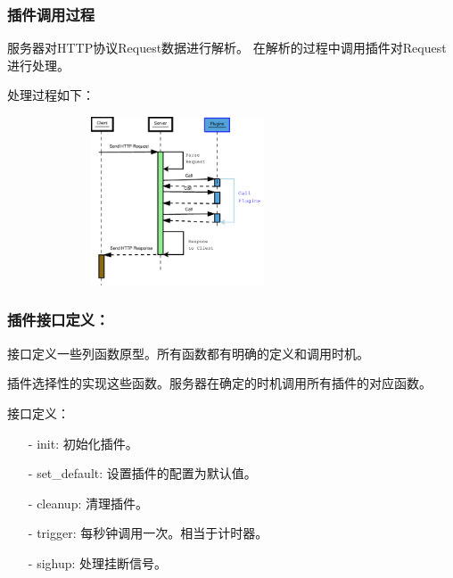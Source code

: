 \documentclass[10pt,dvipdfm]{beamer}
\begin{document}
\begin{frame}
	\frametitle{插件调用过程}
	服务器对HTTP协议Request数据进行解析。	在解析的过程中调用插件对Request进行处理。
	
	\pause
	
	\begin{block}{处理过程如下：}
	\begin{figure}[htbp]
	\centering
	\includegraphics[height=5cm, width=8cm]{pics/httpplugin.eps}
	\end{figure}
	\end{block}
\end{frame}


\begin{frame}
	\frametitle{插件接口定义：}
	接口定义一些列函数原型。所有函数都有明确的定义和调用时机。
	
	插件选择性的实现这些函数。服务器在确定的时机调用所有插件的对应函数。
	
	\pause
	
	\begin{block}{接口定义：}
	\begin{itemize}
		\item[-] init: 初始化插件。
		\item[-] set\_default: 设置插件的配置为默认值。
		\item[-] cleanup: 清理插件。
		\item[-] trigger: 每秒钟调用一次。相当于计时器。
		\item[-] sighup: 处理挂断信号。
	\end{itemize}
	\end{block}
\end{frame}
\end{document}

